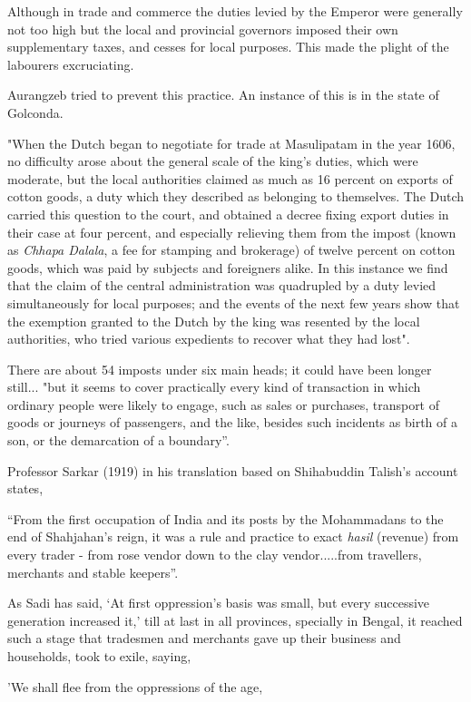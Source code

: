 Although in trade and commerce the duties levied by the Emperor were generally not too high but the local and provincial governors imposed their own supplementary taxes, and cesses for local purposes. This made the plight of the labourers excruciating.

Aurangzeb tried to prevent this practice. An instance of this is in the state of Golconda. 

"When the Dutch began to negotiate for trade at Masulipatam in the year 1606, no difficulty arose about the general scale of the king's duties, which were moderate, but the local authorities claimed as much as 16 percent on exports of cotton goods, a duty which they described as belonging to themselves.  The Dutch carried this question to the court, and obtained a decree fixing export duties in their case at four percent, and especially relieving them from the impost (known as {\it Chhapa Dalala}, a fee for stamping and brokerage) of twelve percent on cotton goods, which was paid by subjects and foreigners alike.  In this instance we find that the claim of the central administration was quadrupled by a duty levied simultaneously for local purposes; and the events of the next few years show that the exemption granted to the Dutch by the king was resented by the local authorities, who tried various expedients to recover what they had lost".

There are about 54 imposts under six main heads; it could have been longer still... "but it seems to cover practically every kind of transaction in which ordinary people were likely to engage, such as sales or purchases, transport of goods or journeys of passengers, and the like, besides such incidents as birth of a son, or the demarcation of a boundary”.

Professor Sarkar (1919) in his translation based on Shihabuddin Talish’s account states, 

“From the first occupation of India and its posts by the Mohammadans to the end of Shahjahan's reign, it was a rule and practice to exact {\it hasil} (revenue) from every trader - from rose vendor down to the clay vendor.....from travellers, merchants and stable keepers”.  

As Sadi has said, ‘At first oppression's basis was small, but every successive generation increased it,’ till at last in all provinces, specially in Bengal, it reached such a stage that tradesmen and merchants gave up their business and households, took to exile, saying,  

'We shall flee from the oppressions of the age,

